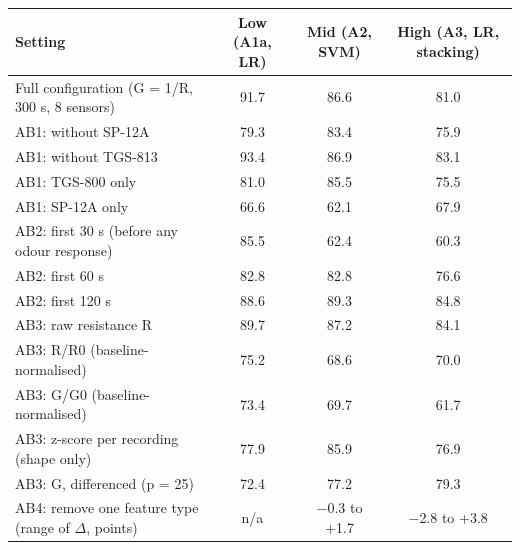 \begin{tabular}{lccc}
\toprule
\textbf{Setting} & \textbf{Low (A1a, LR)} & \textbf{Mid (A2, SVM)} & \textbf{High (A3, LR, stacking)} \\
\midrule
Full configuration (G = 1/R, 300 s, 8 sensors) & 91.7 & 86.6 & 81.0 \\
AB1: without SP-12A & 79.3 & 83.4 & 75.9 \\
AB1: without TGS-813 & 93.4 & 86.9 & 83.1 \\
AB1: TGS-800 only & 81.0 & 85.5 & 75.5 \\
AB1: SP-12A only & 66.6 & 62.1 & 67.9 \\
AB2: first 30 s (before any odour response) & 85.5 & 62.4 & 60.3 \\
AB2: first 60 s & 82.8 & 82.8 & 76.6 \\
AB2: first 120 s & 88.6 & 89.3 & 84.8 \\
AB3: raw resistance R & 89.7 & 87.2 & 84.1 \\
AB3: R/R0 (baseline-normalised) & 75.2 & 68.6 & 70.0 \\
AB3: G/G0 (baseline-normalised) & 73.4 & 69.7 & 61.7 \\
AB3: z-score per recording (shape only) & 77.9 & 85.9 & 76.9 \\
AB3: G, differenced (p = 25) & 72.4 & 77.2 & 79.3 \\
AB4: remove one feature type (range of $\Delta$, points) & n/a & $-$0.3 to +1.7 & $-$2.8 to +3.8 \\
\bottomrule
\end{tabular}
